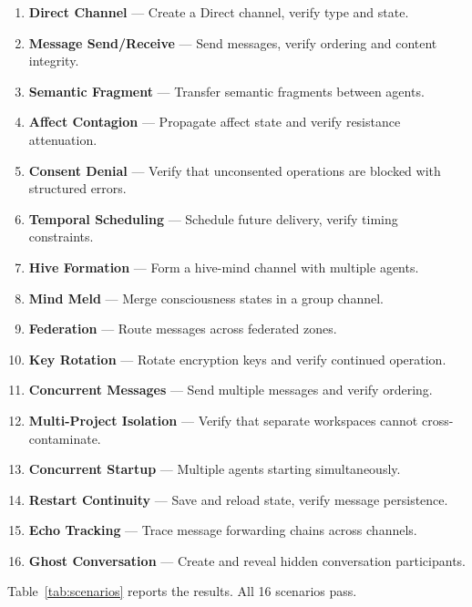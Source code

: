 \documentclass[10pt, twocolumn]{article}
\begin{document}
\begin{enumerate}[nosep, leftmargin=*]
  \item \textbf{Direct Channel} --- Create a Direct channel, verify type and state.
  \item \textbf{Message Send/Receive} --- Send messages, verify ordering and content integrity.
  \item \textbf{Semantic Fragment} --- Transfer semantic fragments between agents.
  \item \textbf{Affect Contagion} --- Propagate affect state and verify resistance attenuation.
  \item \textbf{Consent Denial} --- Verify that unconsented operations are blocked with structured errors.
  \item \textbf{Temporal Scheduling} --- Schedule future delivery, verify timing constraints.
  \item \textbf{Hive Formation} --- Form a hive-mind channel with multiple agents.
  \item \textbf{Mind Meld} --- Merge consciousness states in a group channel.
  \item \textbf{Federation} --- Route messages across federated zones.
  \item \textbf{Key Rotation} --- Rotate encryption keys and verify continued operation.
  \item \textbf{Concurrent Messages} --- Send multiple messages and verify ordering.
  \item \textbf{Multi-Project Isolation} --- Verify that separate workspaces cannot cross-contaminate.
  \item \textbf{Concurrent Startup} --- Multiple agents starting simultaneously.
  \item \textbf{Restart Continuity} --- Save and reload state, verify message persistence.
  \item \textbf{Echo Tracking} --- Trace message forwarding chains across channels.
  \item \textbf{Ghost Conversation} --- Create and reveal hidden conversation participants.
\end{enumerate}

Table~\ref{tab:scenarios} reports the results. All 16 scenarios pass.
\end{document}
